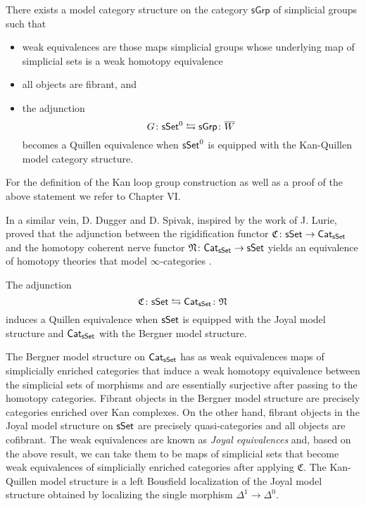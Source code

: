 \begin{theorem} \label{kan} There exists a model category structure on the category $\mathsf{sGrp}$ of simplicial groups such that 
\begin{itemize}
    \item weak equivalences are those maps simplicial groups whose underlying map of simplicial sets is a weak homotopy equivalence
    \item all objects are fibrant, and
\item the adjunction
$$G \colon \mathsf{sSet}^0 \leftrightarrows \mathsf{sGrp}\colon \overline{W}$$
becomes a Quillen equivalence when $\mathsf{sSet}^0$ is equipped with the Kan-Quillen model category structure.
\end{itemize}
\end{theorem}

 For the definition of the Kan loop group construction as well as a proof of the above statement we refer to \cite{Goerss-Jardine} Chapter VI. 

In a similar vein, D. Dugger and D. Spivak, inspired by the work of J. Lurie,  proved that the adjunction between the rigidification functor $\mathfrak{C} \colon \mathsf{sSet} \to \mathsf{Cat}_{\mathsf{sSet}}$ and the homotopy coherent nerve functor $\mathfrak{N} \colon \mathsf{Cat}_{\mathsf{sSet}} \to \mathsf{sSet}$ yields an equivalence of homotopy theories that model $\infty$-categories \cite{Dugger-Spivak}.

\begin{theorem} \label{joyalbergner} The adjunction $$ \mathfrak{C} \colon \mathsf{sSet} \leftrightarrows \mathsf{Cat}_{\mathsf{sSet}} \colon \mathfrak{N}$$ induces a Quillen equivalence when $\mathsf{sSet}$ is equipped with the Joyal model structure and $\mathsf{Cat}_{\mathsf{sSet}}$ with the Bergner model structure.
\end{theorem}


\begin{remark} The Bergner model structure on $\mathsf{Cat}_{\mathsf{sSet}}$ has as weak equivalences maps of simplicially enriched categories that induce a weak homotopy equivalence between the simplicial sets of morphisms and are essentially surjective after passing to the homotopy categories. Fibrant objects in the Bergner model structure are precisely categories enriched over Kan complexes. On the other hand, fibrant objects in the Joyal model structure on $\mathsf{sSet}$ are precisely quasi-categories and all objects are cofibrant. The weak equivalences are known as \textit{Joyal equivalences} and, based on the above result, we can take them to be maps of simplicial sets that become weak equivalences of simplicially enriched categories after applying $\mathfrak{C}$. The Kan-Quillen model structure is a left Bousfield localization of the Joyal model structure obtained by localizing the single morphism $\Delta^1 \to \Delta^0.$
\end{remark}


